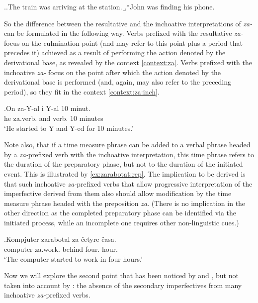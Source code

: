 \ex.\a.\label{ex:achiev:1}The train was arriving at the station.
\b.*John was finding his phone.\label{ex:achiev:2}

So the difference between the resultative and the inchoative interpretations of \textit{za-} can be formulated in the following way. Verbs prefixed with the resultative \textit{za-} focus on the culmination point (and may refer to this point plus a period that precedes it) achieved as a result of performing the action denoted by the derivational base, as revealed by the context \ref{context:za}. Verbs prefixed with the inchoative \textit{za-} focus on the point after which the action denoted by the derivational base is performed (and, again, may also refer to the preceding period), so they fit in the context \ref{context:za:inch}.

\exg.\label{context:za:inch}On za-Y-al i Y-al 10 minut.\\
he za.verb. and verb. 10 minutes\\
\vspace{0.5em}
`He started to Y and Y-ed for 10 minutes.'

Note also, that if a time measure phrase can be added to a verbal phrase headed by a \textit{za-}prefixed verb with the inchoative interpretation, this time phrase refers to the duration of the preparatory phase, but not to the duration of the initiated event. This is illustrated by \ref{ex:zarabotat:rep}. The implication to be derived is that such inchoative \textit{za-}prefixed verbs that allow progressive interpretation of the imperfective derived from them also should allow modification by the time measure phrase headed with the preposition \textit{za}. (There is no implication in the other direction as the completed preparatory phase can be identified via the initiated process, while an incomplete one requires other non-linguistic cues.)

\exg.\label{ex:zarabotat:rep}Kompjuter zarabotal za \v{c}etyre \v{c}asa.\\
computer za.work. behind four. hour.\\
\vspace{0.5em}
`The computer started to work in four hours.'

Now we will explore the second point that has been noticed by \citet{Svenonius:04b} and \citet{Braginsky:08}, but not taken into account by \citet{Tatevosov:09}: the absence of the secondary imperfectives from many inchoative \textit{za-}prefixed verbs. 

